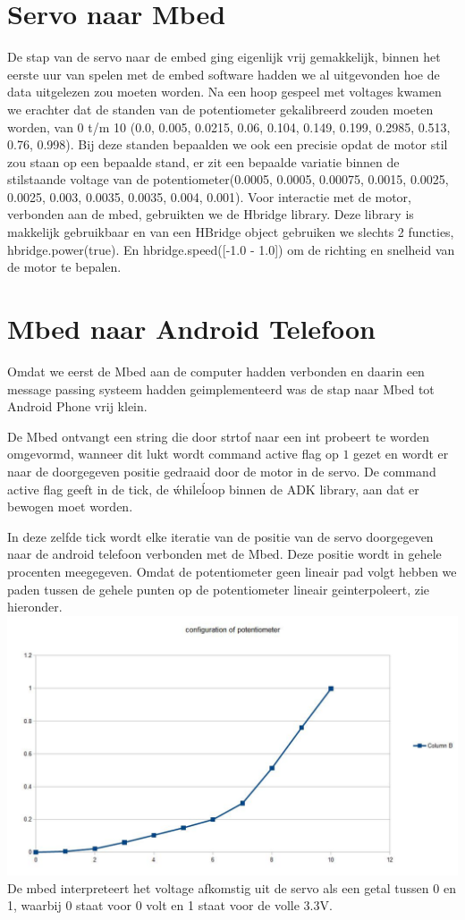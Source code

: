 \documentclass[pdftex,12pt,a4paper]{article}
\begin{document}

\section{Servo naar Mbed}
De stap van de servo naar de embed ging eigenlijk vrij gemakkelijk, binnen het eerste uur van spelen met de embed software hadden we al uitgevonden hoe de data uitgelezen zou moeten worden. Na een hoop gespeel met voltages kwamen we erachter dat de standen van de potentiometer gekalibreerd zouden moeten worden, van 0 t/m 10 (0.0, 0.005, 0.0215, 0.06, 0.104, 0.149, 0.199, 0.2985, 0.513, 0.76, 0.998).
Bij deze standen bepaalden we ook een precisie opdat de motor stil zou staan op een bepaalde stand, er zit een bepaalde variatie binnen de stilstaande voltage van de potentiometer(0.0005, 0.0005, 0.00075, 0.0015, 0.0025, 0.0025, 0.003, 0.0035, 0.0035, 0.004, 0.001).
Voor interactie met de motor, verbonden aan de mbed, gebruikten we de Hbridge library. Deze library is makkelijk gebruikbaar en van een HBridge object gebruiken we slechts 2 functies, hbridge.power(true). En hbridge.speed([-1.0 - 1.0]) om de richting en snelheid van de motor te bepalen.


\section{Mbed naar Android Telefoon}
Omdat we eerst de Mbed aan de computer hadden verbonden en daarin een message passing systeem hadden geimplementeerd was de stap naar Mbed tot Android Phone vrij klein.

De Mbed ontvangt een string die door strtof naar een int probeert te worden omgevormd, wanneer dit lukt wordt command active flag op $1$ gezet en wordt er naar de doorgegeven positie gedraaid door de motor in de servo. De command active flag geeft in de tick, de \' while\' loop binnen de ADK library, aan dat er bewogen moet worden.

In deze zelfde tick wordt elke iteratie van de positie van de servo doorgegeven naar de android telefoon verbonden met de Mbed. Deze positie wordt in gehele procenten meegegeven. Omdat de potentiometer geen lineair pad volgt hebben we paden tussen de gehele punten op de potentiometer lineair geinterpoleert, zie hieronder.\\
\includegraphics[width=1\textwidth]{./calibration.jpg}\\
De mbed interpreteert het voltage afkomstig uit de servo als een getal tussen 0 en 1, waarbij 0 staat voor 0 volt en 1 staat voor de volle 3.3V.
\end{document}

